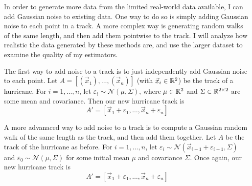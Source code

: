 
\par
In order to generate more data from the limited real-world data available, I can add Gaussian noise to existing data.
One way to do so is simply adding Gaussian noise to each point in a track.
A more complex way is generating random walks of the same length, and then add them pointwise to the track.
I will analyze how realistic the data generated by these methods are, and use the larger dataset to examine the quality of my estimators.

\par
The first way to add noise to a track is to just independently add Gaussian noise to each point.
Let $A=[(\vec{x}_{1}),\ldots,(\vec{x}_{n})]$ (with $\vec{x}_{i}\in\mathbb{R}^{2}$) be the track of a hurricane.
For $i=1,\ldots,n$, let $\varepsilon_{i}\sim\mathcal{N}(\mu,\Sigma)$, where $\mu\in\mathbb{R}^{2}$ and $\Sigma\in\mathbb{R}^{2\times{}2}$ are some mean and covariance.
Then our new hurricane track is
\[
	A'=[\vec{x}_{1}+\varepsilon_{1},\ldots,\vec{x}_{n}+\varepsilon_{n}]
\]

\par
A more advanaced way to add noise to a track is to compute a Gaussian random walk of the same length as the track, and then add them together.
Let $A$ be the track of the hurricane as before.
For $i=1,\ldots,n$, let $\varepsilon_{i}\sim\mathcal{N}(\vec{x}_{i-1}+\varepsilon_{i-1},\Sigma)$ and $\varepsilon_{0}\sim\mathcal{N}(\mu,\Sigma)$ for some initial mean $\mu$ and covariance $\Sigma$.
Once again, our new hurricane track is
\[
	A'=[\vec{x}_{1}+\varepsilon_{1},\ldots,\vec{x}_{n}+\varepsilon_{n}]
\]